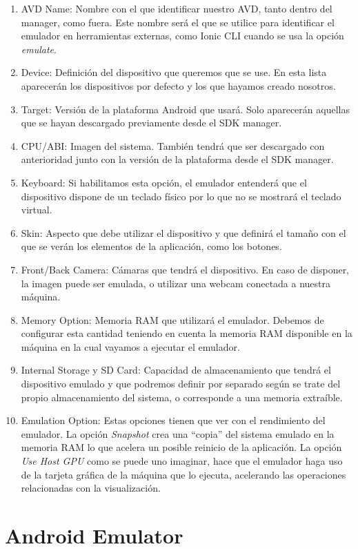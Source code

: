 \begin{enumerate}
  \item AVD Name: Nombre con el que identificar nuestro \gls{AVD}, tanto dentro del manager, como fuera. Este nombre será el que se utilice para identificar el emulador en herramientas externas, como Ionic CLI cuando se usa la opción \emph{emulate}.
  \item Device: Definición del dispositivo que queremos que se use. En esta lista aparecerán los dispositivos por defecto y los que hayamos creado nosotros.
  \item Target: Versión de la plataforma Android que usará. Solo aparecerán aquellas que se hayan descargado previamente desde el \gls{SDK} manager.
  \item CPU/ABI: Imagen del sistema. También tendrá que ser descargado con anterioridad junto con la versión de la plataforma desde el \gls{SDK} manager.
  \item Keyboard: Si habilitamos esta opción, el emulador entenderá que el dispositivo dispone de un teclado físico por lo que no se mostrará el teclado virtual.
  \item Skin: Aspecto que debe utilizar el dispositivo y que definirá el tamaño con el que se verán los elementos de la aplicación, como los botones.
  \item Front/Back Camera: Cámaras que tendrá el dispositivo. En caso de disponer, la imagen puede ser emulada, o utilizar una webcam conectada a nuestra máquina.
  \item Memory Option: Memoria RAM que utilizará el emulador. Debemos de configurar esta cantidad teniendo en cuenta la memoria RAM disponible en la máquina en la cual vayamos a ejecutar el emulador.
  \item Internal Storage y SD Card: Capacidad de almacenamiento que tendrá el dispositivo emulado y que podremos definir por separado según se trate del propio almacenamiento del sistema, o corresponde a una memoria extraíble.
  \item Emulation Option: Estas opciones tienen que ver con el rendimiento del emulador. La opción \emph{Snapshot} crea una ``copia'' del sistema emulado en la memoria RAM lo que acelera un posible reinicio de la aplicación. La opción \emph{Use Host GPU} como se puede uno imaginar, hace que el emulador haga uso de la tarjeta gráfica de la máquina que lo ejecuta, acelerando las operaciones relacionadas con la visualización.
\end{enumerate}

\section{Android Emulator}\label{sec:AndroidEmulator}

